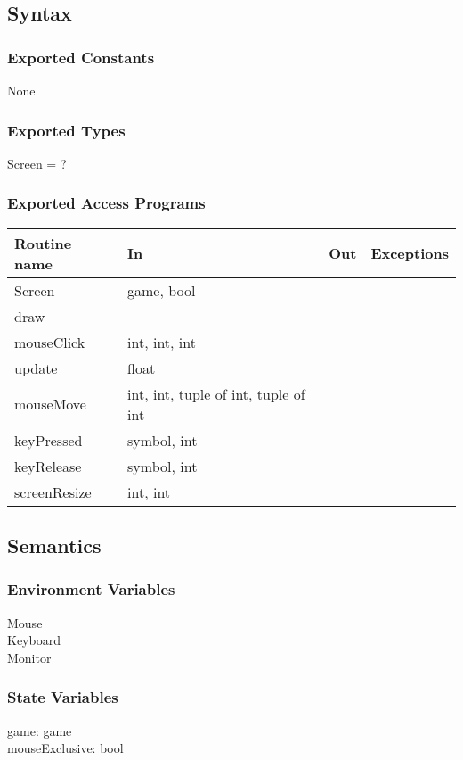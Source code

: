 \documentclass{article}
\begin{document}
\subsection {Syntax}

\subsubsection {Exported Constants}
None

\subsubsection {Exported Types}
Screen = ?

\subsubsection {Exported Access Programs}
\begin{table}[!htbp]
\begin{tabular}{| l | l | l | l |}
\hline
\textbf{Routine name} & \textbf{In} & \textbf{Out} & \textbf{Exceptions}\\
\hline
Screen & game, bool & ~ & ~\\
\hline
draw & ~ & ~& ~\\
\hline
mouseClick & int, int, int & ~& ~\\
\hline
update & float & ~& ~\\
\hline
mouseMove & int, int, tuple of int, tuple of int & ~& ~\\
\hline
keyPressed & symbol, int & ~& ~\\
\hline
keyRelease & symbol, int & ~& ~\\
\hline
screenResize & int, int & ~& ~\\
\hline
\end{tabular}

\end{table}
\FloatBarrier

\subsection {Semantics}

\subsubsection {Environment Variables}
Mouse\\
Keyboard\\
Monitor

\subsubsection {State Variables}
game: game\\
mouseExclusive: bool
\end{document}
